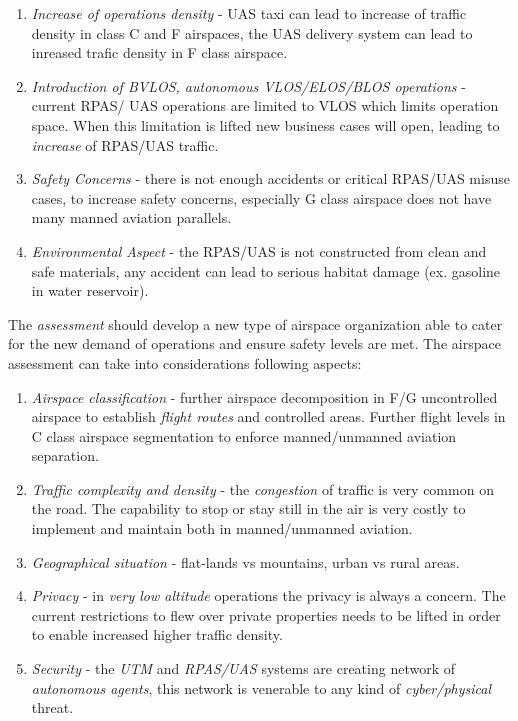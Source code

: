 \begin{enumerate}
    \item \emph{Increase of operations density} - UAS taxi can lead to increase of traffic density in class C and F airspaces, the UAS delivery system can lead to inreased trafic density in F class airspace. 
    
    \item \emph{Introduction of BVLOS, autonomous VLOS/ELOS/BLOS operations} - current RPAS/ UAS operations are limited to VLOS which limits operation space. When this limitation is lifted new business cases will open, leading to \emph{increase} of RPAS/UAS traffic.
    
    \item \emph{Safety Concerns} - there is not enough accidents or critical RPAS/UAS misuse cases, to increase safety concerns, especially G class airspace does not have many manned aviation parallels.
    
    \item \emph{Environmental Aspect} - the RPAS/UAS is not constructed from clean and safe materials, any accident can lead to serious habitat damage (ex. gasoline in water reservoir).
\end{enumerate}

\noindent The \emph{assessment} should develop a new type of airspace organization able to cater for the new demand of operations and ensure safety levels are met. The airspace assessment can take into considerations following aspects:

\begin{enumerate}
    \item \emph{Airspace classification} - further airspace decomposition in F/G  uncontrolled airspace to establish \emph{flight routes} and controlled areas. Further flight levels in C class airspace segmentation to enforce manned/unmanned aviation separation.
    
    \item \emph{Traffic complexity and density} - the \emph{congestion} of traffic is very common on the road. The capability to stop or stay still in the air is very costly to implement and maintain both in manned/unmanned aviation.
    
    \item \emph{Geographical situation} - flat-lands vs mountains, urban vs rural areas.
    
    \item \emph{Privacy} - in \emph{very low altitude} operations the privacy is always a concern.  The current restrictions to flew over private properties needs to be lifted in order to enable increased higher traffic density.
    
    \item \emph{Security} - the \emph{UTM} and \emph{RPAS/UAS} systems are creating network of \emph{autonomous agents}, this network is venerable to any kind of \emph{cyber/physical} threat.
\end{enumerate}

